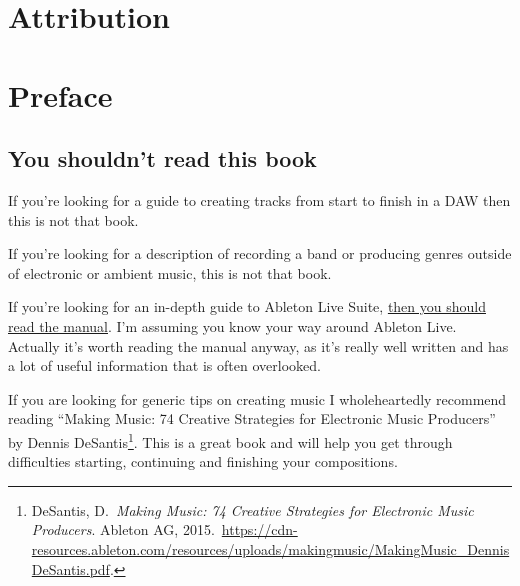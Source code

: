 \documentclass[
  12pt,
  letterpaper,
  oneside,
  open=any]{scrbook}
\renewcommand*\contentsname{Table of contents}
\newcommand\contentsname{Table of contents}
\begin{document}

\renewcommand*\contentsname{Chapters}
{
\hypersetup{linkcolor=}
\setcounter{tocdepth}{1}
\tableofcontents
}
\mainmatter
{}

\chapter*{Attribution}\label{attribution}



\chapter*{Preface}\label{000-Preface}


\section*{You shouldn't read this
book}\label{you-shouldnt-read-this-book}


If you're looking for a guide to creating tracks from start to finish in
a DAW then this is not that book.

If you're looking for a description of recording a band or producing
genres outside of electronic or ambient music, this is not that book.

If you're looking for an in-depth guide to Ableton Live Suite,
\href{https://www.ableton.com/en/manual/welcome-to-live/}{then you
should read the manual}. I'm assuming you know your way around Ableton
Live. Actually it's worth reading the manual anyway, as it's really well
written and has a lot of useful information that is often overlooked.

If you are looking for generic tips on creating music I wholeheartedly
recommend reading ``Making Music: 74 Creative Strategies for Electronic
Music Producers'' by Dennis DeSantis\footnote{DeSantis, D.~\emph{Making
  Music: 74 Creative Strategies for Electronic Music Producers}. Ableton
  AG,
  2015.~\url{https://cdn-resources.ableton.com/resources/uploads/makingmusic/MakingMusic_DennisDeSantis.pdf}.}.
This is a great book and will help you get through difficulties
starting, continuing and finishing your compositions.
\end{document}

